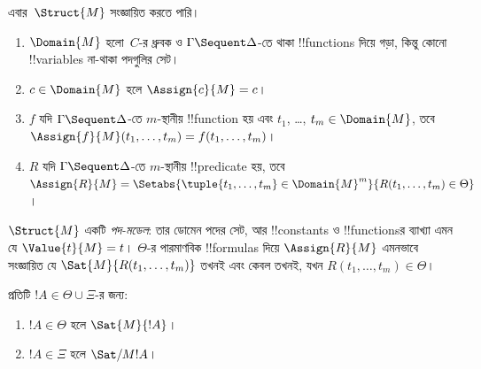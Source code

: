 \documentclass[../../../include/open-logic-section]{subfiles}
\begin{document}
এবার~$\Struct{M}$ সংজ্ঞায়িত করতে পারি।
\begin{enumerate}
\item $\Domain{M}$ হলো~$C$-র
ধ্রুবক ও
$\Gamma \Sequent \Delta$-তে থাকা
!!{function}s দিয়ে গড়া,
কিন্তু কোনো !!{variable}s না-থাকা
পদগুলির সেট।
\item $c \in \Domain{M}$ হলে
$\Assign{c}{M} = c$।
\item $f$ যদি
$\Gamma \Sequent \Delta$-তে
$m$-স্থানীয় !!{function} হয়
এবং $t_1$, \dots,
$t_m \in \Domain{M}$,
তবে $\Assign{f}{M}(t_1, \dots, t_m) =
f(t_1, \dots, t_m)$।
\item $R$ যদি
$\Gamma \Sequent \Delta$-তে
$m$-স্থানীয় !!{predicate} হয়,
তবে $\Assign{R}{M} =
\Setabs{\tuple{t_1, \dots, t_m} \in
\Domain{M}^m}{R(t_1, \dots, t_m) \in \Theta}$।
\end{enumerate}
$\Struct{M}$ একটি
\emph{পদ-মডেল}: তার ডোমেন
পদের সেট, আর !!{constant}s
ও !!{function}sর ব্যাখ্যা
এমন যে $\Value{t}{M} = t$।
$\Theta$-র পারমাণবিক
!!{formula}s দিয়ে
$\Assign{R}{M}$ এমনভাবে
সংজ্ঞায়িত যে
$\Sat{M}{R(t_1, \dots, t_m)}$
তখনই এবং কেবল তখনই,
যখন $R(t_1, \dots, t_m)
\in \Theta$।

\begin{lem}
প্রতিটি $!A \in \Theta \cup \Xi$-র জন্য:
\begin{enumerate}
  \item $!A \in \Theta$ হলে $\Sat{M}{!A}$।
  \item $!A \in \Xi$ হলে $\Sat/{M}{!A}$।
\end{enumerate}
\end{lem}
\end{document}
